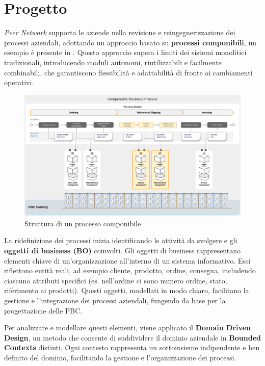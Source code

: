 \chapter{Progetto}
\label{chap:project}

\textit{Peer Network} supporta le aziende nella revisione e reingegnerizzazione dei processi aziendali, adottando un
approccio basato su \textbf{processi componibili}, un esempio è presente in . Questo approccio
supera i limiti dei sistemi monolitici tradizionali, introducendo moduli autonomi, riutilizzabili e facilmente
combinabili, che garantiscono flessibilità e adattabilità di fronte ai cambiamenti operativi.

\begin{figure}
    \centering
    \includegraphics[width=\linewidth]{figures/composable_process.pdf}
    \caption{Struttura di un processo componibile}
    \label{fig:composable-process}
\end{figure}

La ridefinizione dei processi inizia identificando le attività da svolgere e gli \textbf{oggetti di business (BO)} coinvolti.
Gli oggetti di business rappresentano elementi chiave di un’organizzazione all’interno di un sistema informativo. Essi
riflettono entità reali, ad esempio cliente, prodotto, ordine, consegna, includendo ciascuno attributi specifici
(es. nell’ordine ci sono numero ordine, stato, riferimento ai prodotti). Questi oggetti, modellati in modo chiaro,
facilitano la gestione e l’integrazione dei processi aziendali, fungendo da base per la progettazione delle \ac{PBC}.

Per analizzare e modellare questi elementi, viene applicato il \textbf{Domain Driven Design}\cite{evans2004domain}, un metodo che consente di
suddividere il dominio aziendale in \textbf{Bounded Contexts} distinti. Ogni contesto rappresenta un sottoinsieme indipendente
e ben definito del dominio, facilitando la gestione e l’organizzazione dei processi.

